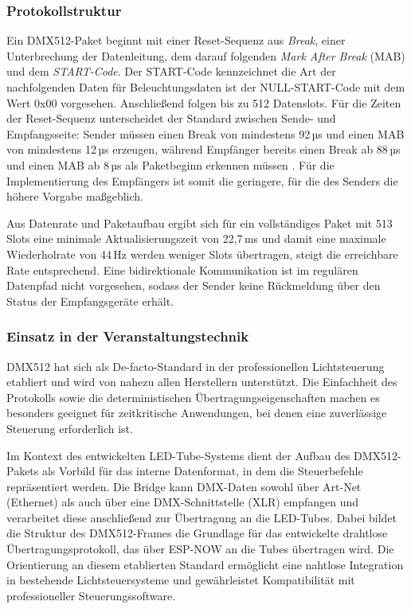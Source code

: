 \subsubsection{Protokollstruktur}
\label{subsubsec:dmx512-protokoll}

Ein DMX512-Paket beginnt mit einer Reset-Sequenz aus \textit{Break}, einer Unterbrechung
der Datenleitung, dem darauf folgenden \textit{Mark After Break} (MAB) und dem
\textit{START-Code}. Der START-Code kennzeichnet die Art der nachfolgenden Daten für
Beleuchtungsdaten ist der NULL-START-Code mit dem Wert 0x00 vorgesehen. Anschließend
folgen bis zu 512 Datenslots. Für die Zeiten der Reset-Sequenz unterscheidet der
Standard zwischen Sende- und Empfangsseite: Sender müssen einen Break von mindestens
92\,µs und einen MAB von mindestens 12\,µs erzeugen, während Empfänger bereits einen
Break ab 88\,µs und einen MAB ab 8\,µs als Paketbeginn erkennen müssen
\cite{ANSI_E1.11_2024}. Für die Implementierung des Empfängers ist somit die geringere,
für die des Senders die höhere Vorgabe maßgeblich.

Aus Datenrate und Paketaufbau ergibt sich für ein vollständiges Paket mit 513 Slots eine
minimale Aktualisierungszeit von 22,7\,ms und damit eine maximale Wiederholrate von
44\,Hz \cite{ANSI_E1.11_2024} werden weniger Slots übertragen, steigt die erreichbare
Rate entsprechend. Eine bidirektionale Kommunikation ist im regulären Datenpfad nicht
vorgesehen, sodass der Sender keine Rückmeldung über den Status der Empfangsgeräte
erhält.

\subsubsection{Einsatz in der Veranstaltungstechnik}
\label{subsubsec:dmx512-einsatz}

DMX512 hat sich als De-facto-Standard in der professionellen Lichtsteuerung etabliert
und wird von nahezu allen Herstellern unterstützt. Die Einfachheit des Protokolls sowie
die deterministischen Übertragungseigenschaften machen es besonders geeignet für
zeitkritische Anwendungen, bei denen eine zuverlässige Steuerung
erforderlich ist.

Im Kontext des entwickelten LED-Tube-Systems dient der Aufbau des DMX512-Pakets als
Vorbild für das interne Datenformat, in dem die Steuerbefehle repräsentiert werden. Die Bridge kann DMX-Daten sowohl über Art-Net 
(Ethernet) als auch über eine DMX-Schnittstelle (XLR) empfangen und verarbeitet 
diese anschließend zur Übertragung an die LED-Tubes. Dabei bildet die Struktur des 
DMX512-Frames die Grundlage für das entwickelte drahtlose Übertragungsprotokoll, das 
über ESP-NOW an die Tubes übertragen wird. 
Die Orientierung an diesem etablierten Standard ermöglicht eine nahtlose Integration in 
bestehende Lichtsteuersysteme und gewährleistet Kompatibilität mit professioneller 
Steuerungssoftware.


